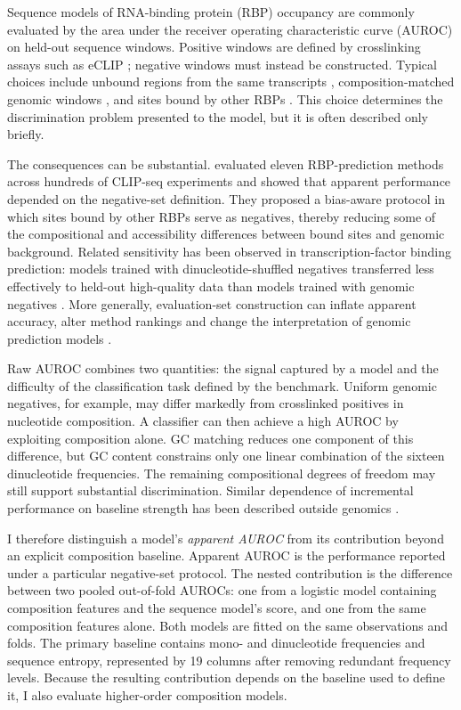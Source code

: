 Sequence models of RNA-binding protein (RBP) occupancy are commonly evaluated by the area under
the receiver operating characteristic curve (AUROC) on held-out sequence windows. Positive
windows are defined by crosslinking assays such as eCLIP
\citep{vannostrand2016,vannostrand2020}; negative windows must instead be constructed. Typical
choices include unbound regions from the same transcripts \citep{maticzka2014},
composition-matched genomic windows \citep{khan2021}, and sites bound by other RBPs
\citep{horlacher2023}. This choice determines the discrimination problem presented to the
model, but it is often described only briefly.

The consequences can be substantial. \citet{horlacher2023} evaluated eleven RBP-prediction
methods across hundreds of CLIP-seq experiments and showed that apparent performance depended
on the negative-set definition. They proposed a bias-aware protocol in which sites bound by
other RBPs serve as negatives, thereby reducing some of the compositional and accessibility
differences between bound sites and genomic background. Related sensitivity has been observed
in transcription-factor binding prediction: models trained with dinucleotide-shuffled
negatives transferred less effectively to held-out high-quality data than models trained with
genomic negatives \citep{tourne2026}. More generally, evaluation-set construction can inflate
apparent accuracy, alter method rankings and change the interpretation of genomic prediction
models \citep{grimm2015,whalen2022,krutzfeldt2020,cohendavidi2024}.

Raw AUROC combines two quantities: the signal captured by a model and the difficulty of the
classification task defined by the benchmark. Uniform genomic negatives, for example, may
differ markedly from crosslinked positives in nucleotide composition. A classifier can then
achieve a high AUROC by exploiting composition alone. GC matching reduces one component of
this difference, but GC content constrains only one linear combination of the sixteen
dinucleotide frequencies. The remaining compositional degrees of freedom may still support
substantial discrimination. Similar dependence of incremental performance on baseline strength
has been described outside genomics \citep{pencina2012}.

I therefore distinguish a model's \emph{apparent AUROC} from its contribution beyond an
explicit composition baseline. Apparent AUROC is the performance reported under a particular
negative-set protocol. The nested contribution is the difference between two pooled
out-of-fold AUROCs: one from a logistic model containing composition features and the sequence
model's score, and one from the same composition features alone. Both models are fitted on the
same observations and folds. The primary baseline contains mono- and dinucleotide frequencies
and sequence entropy, represented by 19 columns after removing redundant frequency levels.
Because the resulting contribution depends on the baseline used to define it, I also evaluate
higher-order composition models.

